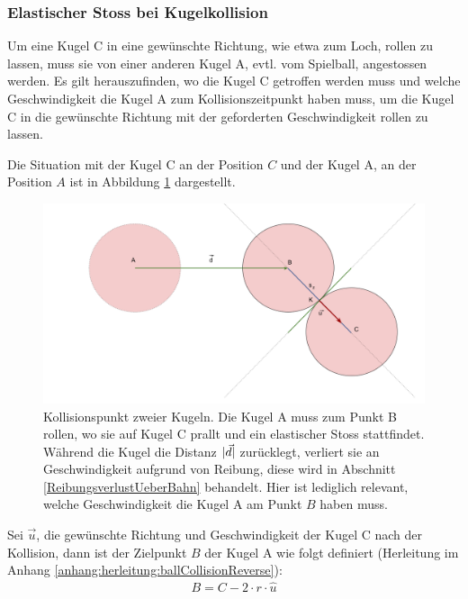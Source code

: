 \subsubsection{Elastischer Stoss bei Kugelkollision}\label{EnergieuebergabeBeiKollision}

Um eine Kugel C in eine gewünschte Richtung, wie etwa zum Loch, rollen zu lassen, muss sie von einer anderen Kugel A,
evtl. vom Spielball, angestossen werden.
Es gilt herauszufinden, wo die Kugel C getroffen werden muss und welche Geschwindigkeit die Kugel A zum Kollisionszeitpunkt
haben muss, um die Kugel C in die gewünschte Richtung mit der geforderten Geschwindigkeit rollen zu lassen.

Die Situation mit der Kugel C an der Position $C$ und der Kugel A, an der Position $A$ ist in Abbildung \ref{fig:ballCollisionPointReverse}
dargestellt.

\begin{figure}[h!]
    \begin{center}
        \includegraphics[width=0.6\linewidth]{../common/03_billiard_ai/resources/21_kollisionspunkt_rueckwaerts.png}
    \end{center}
    \caption{Kollisionspunkt zweier Kugeln.
    Die Kugel A muss zum Punkt B rollen, wo sie auf Kugel C prallt und ein elastischer Stoss \cite{wiki.elastischer_stoss_physik:1} stattfindet.
    Während die Kugel die Distanz $\lvert \vec{d} \rvert$ zurücklegt, verliert sie an Geschwindigkeit aufgrund von Reibung,
    diese wird in Abschnitt \ref{ReibungsverlustUeberBahn} behandelt. Hier ist lediglich relevant, welche Geschwindigkeit
    die Kugel A am Punkt $B$ haben muss.
    }
    \label{fig:ballCollisionPointReverse}
\end{figure}

Sei $\vec{u}$, die gewünschte Richtung und Geschwindigkeit der Kugel C nach der Kollision,
dann ist der Zielpunkt $B$ der Kugel A wie folgt definiert (Herleitung im Anhang \ref{anhang:herleitung:ballCollisionReverse}):
\begin{align}
    B = C - 2 \cdot r \cdot \hat{u}
\end{align}

